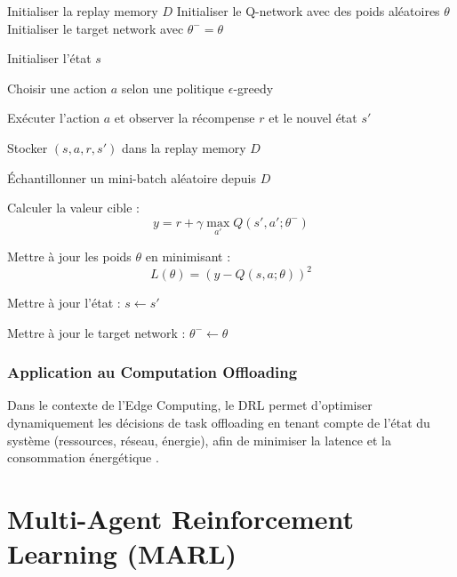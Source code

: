 \documentclass[12pt,a4paper]{report}
\begin{document}
\begin{algorithm}[H]
\caption{Deep Q-Network (DQN)}
\begin{algorithmic}[1]

\STATE Initialiser la replay memory $D$
\STATE Initialiser le Q-network avec des poids aléatoires $\theta$
\STATE Initialiser le target network avec $\theta^{-} = \theta$

    \STATE Initialiser l’état $s$
    
    
        \STATE Choisir une action $a$ selon une politique $\epsilon$-greedy
        
        \STATE Exécuter l’action $a$ et observer la récompense $r$ et le nouvel état $s'$
        
        \STATE Stocker $(s, a, r, s')$ dans la replay memory $D$
        
        \STATE Échantillonner un mini-batch aléatoire depuis $D$
        
            \STATE Calculer la valeur cible :
            \[
            y = r + \gamma \max_{a'} Q(s', a'; \theta^{-})
            \]
        \ENDFOR
        
        \STATE Mettre à jour les poids $\theta$ en minimisant :
        \[
        L(\theta) = (y - Q(s,a;\theta))^2
        \]
        
        \STATE Mettre à jour l’état : $s \leftarrow s'$
        
            \STATE Mettre à jour le target network : $\theta^{-} \leftarrow \theta$
        \ENDIF
        
    \ENDFOR
\ENDFOR

\end{algorithmic}
\end{algorithm}


\subsubsection{Application au Computation Offloading}

Dans le contexte de l’Edge Computing, le DRL permet d’optimiser dynamiquement les décisions de task offloading en tenant compte de l’état du système (ressources, réseau, énergie), afin de minimiser la latence et la consommation énergétique \cite{li2018mec}.

\section{Multi-Agent Reinforcement Learning (MARL)}
\end{document}
